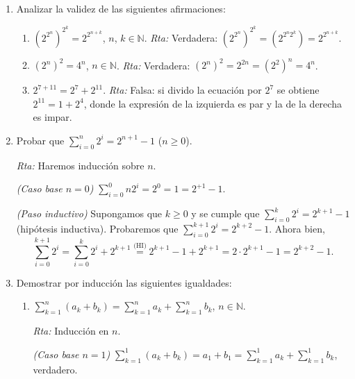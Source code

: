 \documentclass[a4paper,12pt,twoside,spanish,reqno]{amsbook}
\numberwithin{equation}{section}
\newcommand{\rta}{\noindent\textit{Rta: }}
\begin{document}
\begin{enumerate}
        \item Analizar la validez de las siguientes afirmaciones:
        \begin{enumerate}
            \item  $(2^{2^n})^{2^k} = 2^{2^{n+k}}$,  $n$, $k \in {\mathbb N}$.     \rta  Verdadera: $(2^{2^n})^{2^k} =(2^{2^n2^k}) =  2^{2^{n+k}}$.
            \item $(2^n)^2 = 4^n$, $n \in {\mathbb N}$. \rta  Verdadera: $(2^n)^2 = 2^{2n} =(2^2)^n= 4^n$.
            \item $2^{7+11} = 2^7 + 2^{11}$.  \rta  Falsa: si divido la ecuación por $2^7$ se obtiene $2^{11} = 1 + 2^{4}$,  donde la expresión de la izquierda es par y la de la derecha es impar. 
        \end{enumerate}
        
        
        
        \item\label{ej-suma-2-ala-n} Probar que $\sum_{i=0}^n 2^i = 2^{n+1} -1$ ($n \ge 0$). 
        
        \rta Haremos inducción sobre $n$. 
        
        \textit{(Caso base $n=0$) }  $\sum_{i=0}^0n 2^i = 2^0 = 1 = 2^{+1} -1$.
        
        \textit{(Paso inductivo) } Supongamos que $k\ge 0$ y se cumple que  $\sum_{i=0}^k 2^i = 2^{k+1} -1$ (hipótesis inductiva). Probaremos que  $\sum_{i=0}^{k+1} 2^i = 2^{k+2} -1$. Ahora bien, 
        \begin{equation*}
        \sum_{i=0}^{k+1} 2^i = \sum_{i=0}^{k} 2^i + 2^{k+1} \overset{\text{(HI)}}{=}  2^{k+1} -1 + 2^{k+1} = 2 \cdot 2^{k+1} -1 = 2^{k+2} -1.
        \end{equation*}

        
        \item\label{ej-induccion} Demostrar por inducción  las siguientes igualdades:
        \begin{enumerate}
            \item  $\displaystyle{ \sum_{k=1}^n (a_k + b_k) = \sum_{k=1}^n a_k + \sum_{k=1}^n b_k}$, $n\in \mathbb N$.
            
            \rta Inducción en $n$.
            
            \textit{(Caso base $n=1$) }  $\sum_{k=1}^1 (a_k + b_k) = a_1+b_1 = \sum_{k=1}^1 a_k + \sum_{k=1}^1 b_k$, verdadero.
            

\end{enumerate}
\end{enumerate}
\end{document}
